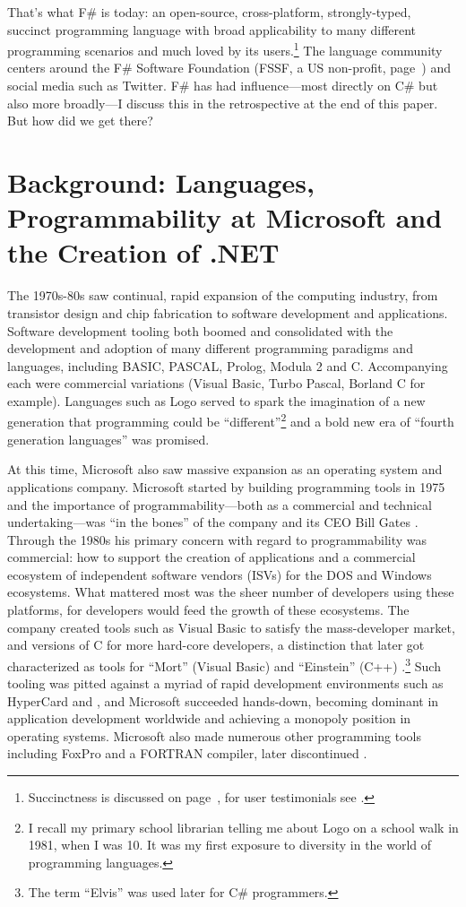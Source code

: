 \documentclass[acmsmall,screen]{acmart}
\begin{document}
That's what F\# is today: an open-source, cross-platform, strongly-typed, succinct programming language with broad applicability
to many different programming scenarios and much loved by its
users.\footnote{Succinctness is discussed on page~\pageref{page:fsharp-succinct}, for user testimonials see \citep{FSharpTestimonials}.}  The language community centers around
the F\# Software Foundation (FSSF, a US non-profit, page~\pageref{page:community}) and social media such as Twitter. F\# has had influence---most
directly on C\# but also more broadly---I discuss this in the retrospective at the end of this paper.  But how did we get there?

\section*{Background: Languages, Programmability at Microsoft and the Creation of .NET}

The 1970s-80s saw continual, rapid expansion of the computing industry, from transistor design and chip fabrication to
software development and applications. Software development tooling both boomed and consolidated with the development
and adoption of many different programming paradigms and languages, including BASIC, PASCAL, Prolog, Modula 2 and C.  Accompanying
each were commercial variations (Visual Basic, Turbo Pascal, Borland C for example). Languages such as Logo served to spark
the imagination of a new generation that programming could be “different”\footnote{I recall my primary school librarian telling me
about Logo on a school walk in 1981, when I was 10. It was my first exposure to diversity in the world of programming languages.} and a
bold new era of “fourth generation languages” was promised. 

At this time, Microsoft also saw massive expansion as an operating system and applications company.  Microsoft started by building
programming tools in 1975 and the importance of programmability---both as a commercial and technical undertaking---was “in the bones” of
the company and its CEO Bill Gates \citep{MicrosoftHistoryWikipedia}.  Through the 1980s his primary concern with regard to programmability was commercial: how
to support the creation of applications and a commercial ecosystem of independent software vendors (ISVs) for the DOS and
Windows ecosystems.  What mattered most was the sheer number of developers using these platforms, for developers would
feed the growth of these ecosystems.  The company created tools such as Visual Basic to satisfy the mass-developer
market, and versions of C for more hard-core developers, a distinction that later got characterized as
tools for “Mort” (Visual Basic) and “Einstein” (C++) \citep{RefMort}.\footnote{The term “Elvis” was used later for C\# programmers.}
Such tooling was pitted against a myriad of rapid development
environments such as HyperCard \citep{RefHyperCard} and
\citep{RefToolBook}, and Microsoft succeeded
hands-down, becoming dominant in application development worldwide and achieving a monopoly position in operating
systems.  Microsoft also made numerous other programming tools including FoxPro \citep{RefFoxPro} and a FORTRAN compiler, later
discontinued \citep{RefFortran}.
\end{document}
